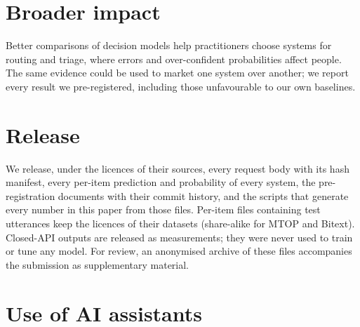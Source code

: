 \section{Broader impact}
Better comparisons of decision models help practitioners choose systems for routing and triage, where errors and
over-confident probabilities affect people. The same evidence could be used to market one system over another; we
report every result we pre-registered, including those unfavourable to our own baselines.

\section{Release}
\label{sec:release}
We release, under the licences of their sources, every request body with its hash manifest, every per-item
prediction and probability of every system, the pre-registration documents with their commit history, and the
scripts that generate every number in this paper from those files. Per-item files containing test utterances keep
the licences of their datasets (share-alike for MTOP and Bitext). Closed-API outputs are released as measurements;
they were never used to train or tune any model. For review, an anonymised archive of these files accompanies the
submission as supplementary material.

\section*{Use of AI assistants}
